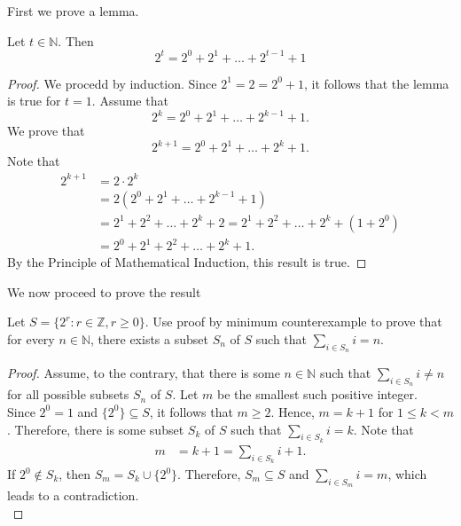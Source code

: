 \documentclass[12pt]{article}
\newcommand{\N}{\mathbb{N}}
\newcommand{\Z}{\mathbb{Z}}
\newenvironment{lemma}[2][Lemma]{\begin{trivlist}
		\item[\hskip \labelsep {\bfseries #1}\hskip \labelsep {\bfseries #2.}]}{\end{trivlist}}
\newenvironment{result}[2][Result]{\begin{trivlist}
			\item[\hskip \labelsep {\bfseries #1}\hskip \labelsep {\bfseries #2.}]}{\end{trivlist}}
\newenvironment{problem}[2][Problem]{\begin{trivlist}
		\item[\hskip \labelsep {\bfseries #1}\hskip \labelsep {\bfseries #2.}]}{\end{trivlist}}
\begin{document}
\begin{problem}{40}
	First we prove a lemma.
	\begin{lemma}{1}
		Let $t\in \N$. Then 
		\begin{equation*}
			2^{t} = 2^{0}+2^{1}+\ldots+2^{t-1} + 1
		\end{equation*}
	\begin{proof}
		We procedd by induction. Since $2^{1} = 2 = 2^{0}+1$, it follows that the lemma is true for $t=1$. Assume that
		\begin{equation*}
			2^{k} = 2^{0}+2^{1}+\ldots+2^{k-1}+1.
		\end{equation*}
		We prove that 
		\begin{equation*}
			2^{k+1} = 2^{0}+2^{1}+\ldots +2^{k}+1.
		\end{equation*}
		Note that
		\begin{align*}
			2^{k+1} &= 2\cdot 2^{k}\\
			&= 2\left(2^{0}+2^{1}+\ldots+2^{k-1}+1\right)\\
			&= 2^{1}+2^{2}+\ldots+2^{k}+2 = 2^{1}+2^{2}+\ldots+2^{k}+\left(1+2^{0}\right)\\
			&= 2^{0}+2^{1}+2^{2}+\ldots+2^{k}+1.
		\end{align*}
	By the Principle of Mathematical Induction, this result is true.
	\end{proof}
	\end{lemma}

	We now proceed to prove the result\\
	
	\begin{result}{40}
	Let $S=\{2^{r}:r\in \Z, r\geq 0\}$. Use proof by minimum counterexample to prove that for every $n\in \N$, there exists a subset $S_{n}$ of $S$ such that $\sum_{i\in S_{n}}i=n$.
	\begin{proof}
		Assume, to the contrary, that there is some $n\in \N$ such that $\sum_{i\in S_{n}}i\neq n$ for all possible subsets $S_{n}$ of $S$. Let $m$ be the smallest such positive integer. \\
		Since $2^{0} = 1$ and $\{2^{0}\}\subseteq S$, it follows that $m \geq 2$. Hence, $m=k+1$ for $1\leq k <m$. Therefore, there is some subset $S_{k}$ of $S$ such that $\sum_{i\in S_{k}}i = k$. Note that
		\begin{align*}
			m &= k+1 = \sum_{i\in S_{k}}i +1. 
		\end{align*}
	If $2^{0} \notin S_{k}$, then $S_{m} = S_{k}\cup \{2^{0}\}$. Therefore, $S_{m} \subseteq S$ and $\sum_{i\in S_{m}}i = m$, which leads to a contradiction. \\
	

\end{proof}
\end{result}
\end{problem}
\end{document}
